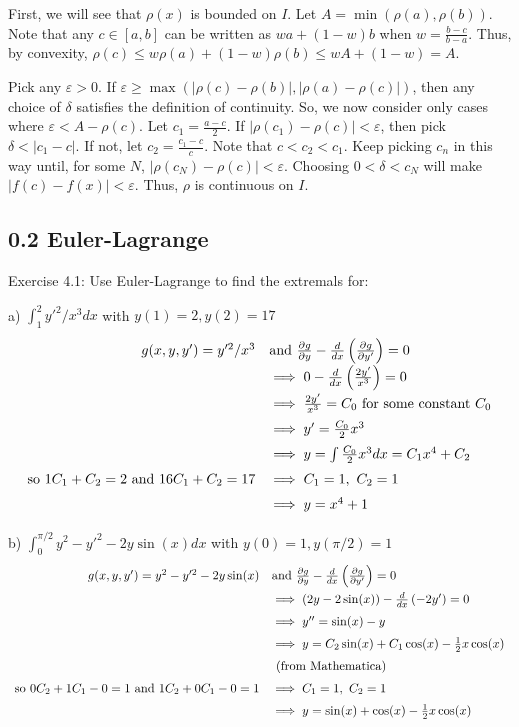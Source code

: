 \documentclass[11pt]{article}
\begin{document}
First, we will see that $\rho(x)$ is bounded on $I$.
Let $A=\min(\rho(a),\rho(b))$.
Note that any $c\in[a,b]$ can be written as
$wa+(1-w)b$ when $w=\frac{b-c}{b-a}$. Thus, by convexity,
$\rho(c)\leq w\rho(a)+(1-w)\rho(b)\leq wA+(1-w)=A$.

Pick any $\varepsilon>0$. If
$\varepsilon\geq\max(|\rho(c)-\rho(b)|,|\rho(a)-\rho(c)|)$, then any
choice of $\delta$ satisfies the definition of continuity. So, we now
consider only cases where
$\varepsilon<A-\rho(c)$. Let $c_1=\frac{a-c}{2}$.
If $|\rho(c_1)-\rho(c)|<\varepsilon$, then pick $\delta<|c_1-c|$. If not,
let $c_2=\frac{c_1-c}{c}$. Note that $c<c_2<c_1$.
Keep picking $c_n$ in this way until, for some $N$,
$|\rho(c_N)-\rho(c)|<\varepsilon$. Choosing $0<\delta<c_N$ will make
$|f(c)-f(x)|<\varepsilon$. Thus, $\rho$ is continuous on $I$.

\subsection*{0.2 Euler-Lagrange}

Exercise 4.1: Use Euler-Lagrange to find the extremals for:

a) $\int_1^2y'^2/x^3dx$ with $y(1)=2,y(2)=17$
\[
\def\arraystretch{1.5}
\begin{array}{rl}
    g(x,y,y')=y'^2/x^3 &\textrm{and}\ 
    \frac{\partial g}{\partial y}-\frac{d}{dx}\left(\frac{\partial g}{\partial y'}\right)=0 \\
    &\implies 0-\frac{d}{dx}\left(\frac{2y'}{x^3}\right)=0 \\
    &\implies \frac{2y'}{x^3}=C_0\textrm{ for some constant $C_0$} \\
    &\implies y'=\frac{C_0}{2}x^3 \\
    &\implies y=\int\frac{C_0}{2}x^3dx=C_1x^4+C_2 \\
    \textrm{so }1C_1+C_2=2\textrm{ and }16C_1+C_2=17 &\implies
    C_1=1,\ C_2=1 \\
    &\implies y=x^4+1
\end{array}
\]

b) $\int_0^{\pi/2}y^2-y'^2-2y\sin(x) dx$ with $y(0)=1,y(\pi/2)=1$
\[
\def\arraystretch{1.5}
\begin{array}{rl}
    g(x,y,y')=y^2-y'^2-2y\sin(x) &\textrm{and}\ 
    \frac{\partial g}{\partial y}-\frac{d}{dx}\left(\frac{\partial g}{\partial y'}\right)=0 \\
    &\implies (2y-2\sin(x))-\frac{d}{dx}\left(-2y'\right)=0 \\
    &\implies y''=\sin(x)-y \\
    &\implies y=C_2\sin(x)+C_1\cos(x)-\frac{1}{2}x\cos(x) \\
    &\textrm{ (from Mathematica) } \\
    \textrm{so }0C_2+1C_1-0=1\textrm{ and }1C_2+0C_1-0=1 &\implies
    C_1=1,\ C_2=1 \\
    &\implies y=\sin(x)+\cos(x)-\frac{1}{2}x\cos(x)
\end{array}
\]
\end{document}
